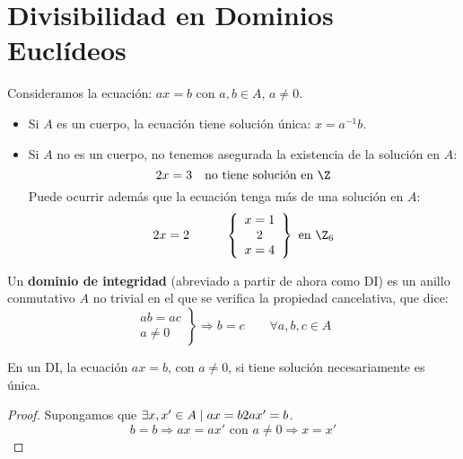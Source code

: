 \chapter{Divisibilidad en Dominios Euclídeos}

Consideramos la ecuación: $ax=b$ con $a,b \in A$, $a \neq 0$.
\begin{itemize}
    \item Si $A$ es un cuerpo, la ecuación tiene solución única: $x=a^{-1}b$.
    \item Si $A$ no es un cuerpo, no tenemos asegurada la existencia de la solución en $A$:
        $$2x=3~~\mbox{ no tiene solución en }\Z$$
        Puede ocurrir además que la ecuación tenga más de una solución en $A$:
        $$2x=2\hspace{1cm}
        \left\{\begin{array}{c}
            x=1 \\ \y \\ x=4
        \end{array}\right\}
        \mbox{ en } \Z_6$$
\end{itemize}

\begin{definicion}
    Un \textbf{dominio de integridad} (abreviado a partir de ahora como DI) es un anillo conmutativo $A$ no trivial en el que
    se verifica la propiedad cancelativa, que dice:
    $$\left. \begin{array}{c}
            ab = ac \\
            a \neq 0
        \end{array} \right\} \Longrightarrow b=c\qquad \forall a,b,c\in A$$
\end{definicion}

\begin{lema}
En un DI, la ecuación $ax=b$, con $a\neq 0$, si tiene solución necesariamente es única.
\end{lema}
\begin{proof}
    Supongamos que $\exists x,x' \in A \mid ax = b 2 ax' =b$.
    $$b=b \Longrightarrow ax = ax' \mbox{ con } a\neq 0 \Longrightarrow x = x'$$
\end{proof}

